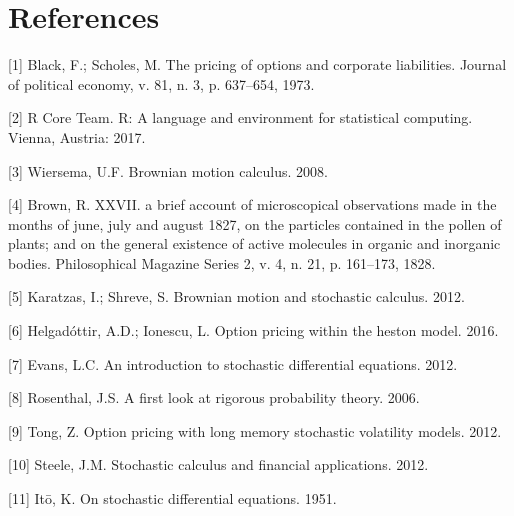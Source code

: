 \documentclass[12pt,twoside]{reedthesis}
\theoremstyle{definition}
\theoremstyle{definition}
\theoremstyle{remark}
\begin{document}
  \clearpage
  
  \backmatter
  
  \chapter{References}\label{references}
  
   
  
  \setlength{\parindent}{-0.0in} \setlength{\leftskip}{0.00in}
  \setlength{\parskip}{7pt}
  
  \hypertarget{refs}{}
  \hypertarget{ref-black1973pricing}{}
  {[}1{]} Black, F.; Scholes, M. The pricing of options and corporate
  liabilities. Journal of political economy, v. 81, n. 3, p. 637--654,
  1973.
  
  \hypertarget{ref-rlang}{}
  {[}2{]} R Core Team. R: A language and environment for statistical
  computing. Vienna, Austria: 2017.
  
  \hypertarget{ref-ubbo}{}
  {[}3{]} Wiersema, U.F. Brownian motion calculus. 2008.
  
  \hypertarget{ref-brown1828}{}
  {[}4{]} Brown, R. XXVII. a brief account of microscopical observations
  made in the months of june, july and august 1827, on the particles
  contained in the pollen of plants; and on the general existence of
  active molecules in organic and inorganic bodies. Philosophical Magazine
  Series 2, v. 4, n. 21, p. 161--173, 1828.
  
  \hypertarget{ref-karatzas2012brownian}{}
  {[}5{]} Karatzas, I.; Shreve, S. Brownian motion and stochastic
  calculus. 2012.
  
  \hypertarget{ref-helgadottir2016option}{}
  {[}6{]} Helgadóttir, A.D.; Ionescu, L. Option pricing within the heston
  model. 2016.
  
  \hypertarget{ref-evans}{}
  {[}7{]} Evans, L.C. An introduction to stochastic differential
  equations. 2012.
  
  \hypertarget{ref-rosenthal}{}
  {[}8{]} Rosenthal, J.S. A first look at rigorous probability theory.
  2006.
  
  \hypertarget{ref-tong2012option}{}
  {[}9{]} Tong, Z. Option pricing with long memory stochastic volatility
  models. 2012.
  
  \hypertarget{ref-steele2012stochastic}{}
  {[}10{]} Steele, J.M. Stochastic calculus and financial applications.
  2012.
  
  \hypertarget{ref-ito1951}{}
  {[}11{]} Itō, K. On stochastic differential equations. 1951.
  
\end{document}
